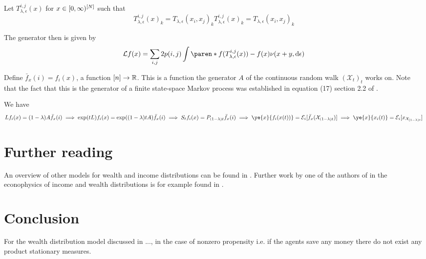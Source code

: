 \documentclass{article}
\begin{document}
Let $T_{\lambda, \epsilon}^{i, j}(x)$ for $x \in [0, \infty)^{[N]}$ such that
\[
T_{\lambda, \epsilon}^{i, j}(x)_k = T_{\lambda, \epsilon}(x_i, x_j)_k
T_{\lambda, \epsilon}^{i, j}(x)_k = T_{\lambda, \epsilon}(x_i, x_j)_k
\]

The generator then is given by
\[
\mathcal{L}f(x) = \sum_{i, j} 2 p(i, j) \int \paren*{f(T_{\lambda, \epsilon}^{i, j}(x)) - f(x)} \nu(x+y, \diff \epsilon)
\]

Define $\bar{f}_x(i) = f_i(x)$, a function $[n] \to \mathbb{R}$. This is a function the generator $A$ of the continuous random walk $(\mathcal{X}_t)_t$ works on. Note that the fact that this is the generator of a finite state-space Markov process was established in equation (17) section 2.2 of \cite{frankredig2014}.

We have
\[
Lf_i(x) = (1 - \lambda) A \bar{f}_x(i)
\\\implies
\exp(tL)f_i(x) = \exp((1 - \lambda)t A) \bar{f}_x (i)
\\\implies
S_t f_i(x) = P_{(1 - \lambda)t} \bar{f}_x(i)
\\\implies
\ye{x}{f_i(x(t))} = \mathcal{E}_i\brackets{\bar{f}_x(\mathcal{X}_{(1-\lambda)t})}
\\\implies
\ye{x}{x_i(t)} = \mathcal{E}_i\brackets{x_{\mathcal{X}_{(1-\lambda)t}}}
\]


\section*{Further reading}
An overview of other models for wealth and income distributions can be found in \cite{chakrabarti2013econophysics}. Further work by one of the authors of \cite{cirillo2014duality} in the econophysics of income and wealth distributions is for example found in \cite{redig2015multilinearity, 2008arXiv0802.1416D, redig2017generalized}.



\section*{Conclusion}
For the wealth distribution model discussed in ..., in the case of nonzero propensity i.e. if the agents save any money there do not exist any product stationary measures.



\printbibliography
\end{document}
